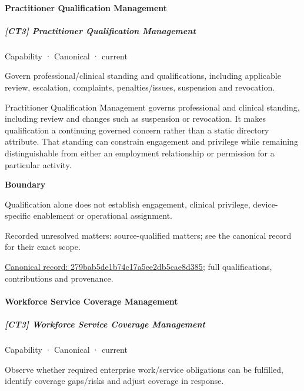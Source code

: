 \paragraph{Practitioner Qualification Management}

\subparagraph{[CT3] Practitioner Qualification Management}

\label{element:279bab5de1b74c17a5ee2db5cae8d385}
{\small Capability · Canonical · current}\par

Govern professional/clinical standing and qualifications, including applicable review, escalation, complaints, penalties/issues, suspension and revocation.



Practitioner Qualification Management governs professional and clinical standing, including review and changes such as suspension or revocation. It makes qualification a continuing governed concern rather than a static directory attribute. That standing can constrain engagement and privilege while remaining distinguishable from either an employment relationship or permission for a particular activity.



\textbf{Boundary}



Qualification alone does not establish engagement, clinical privilege, device-specific enablement or operational assignment.


{\small Recorded unresolved matters: source-qualified matters; see the canonical record for their exact scope.}\par
{\footnotesize \href{../../../../continuum/strategy/capability/279bab5de1b74c17a5ee2db5cae8d385.md}{Canonical record: 279bab5de1b74c17a5ee2db5cae8d385}; full qualifications, contributions and provenance.}\par
\paragraph{Workforce Service Coverage Management}

\subparagraph{[CT3] Workforce Service Coverage Management}

\label{element:cfb04e13895745619171a3e8f15d349c}
{\small Capability · Canonical · current}\par

Observe whether required enterprise work/service obligations can be fulfilled, identify coverage gaps/risks and adjust coverage in response.



